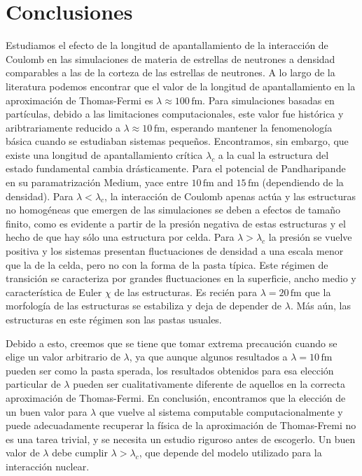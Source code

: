 \section{Conclusiones}\label{concluding}

Estudiamos el efecto de la longitud de apantallamiento de la interacción de Coulomb en las simulaciones de materia de estrellas de neutrones a densidad comparables a las de la corteza de las estrellas de neutrones.
A lo largo de la literatura podemos encontrar que el valor de la longitud de apantallamiento en la aproximación de Thomas-Fermi es $\lambda\approx100\,\text{fm}$.
Para simulaciones basadas en partículas, debido a las limitaciones computacionales, este valor fue histórica y aribtrariamente reducido a $\lambda\approx10\,\text{fm}$, esperando mantener la fenomenología básica cuando se estudiaban sistemas pequeños.
Encontramos, sin embargo, que existe una longitud de apantallamiento crítica $\lambda_c$ a la cual la estructura del estado fundamental cambia drásticamente.
Para el potencial de Pandharipande en su paramatrización Medium, yace entre $10\,\text{fm}$ and $15\,\text{fm}$ (dependiendo de la densidad).
Para $\lambda<\lambda_c$, la interacción de Coulomb apenas actúa y las estructuras no homogéneas que emergen de las simulaciones se deben a efectos de tamaño finito, como es evidente a partir de la presión negativa de estas estructuras y el hecho de que hay sólo una estructura por celda.
Para $\lambda>\lambda_c$ la presión se vuelve positiva y los sistemas presentan fluctuaciones de densidad a una escala menor que la de la celda, pero no con la forma de la pasta típica.
Este régimen de transición se caracteriza por grandes fluctuaciones en la superficie, ancho medio y característica de Euler $\chi$ de las estructuras.
Es recién para $\lambda=20\,\text{fm}$ que la morfología de las estructuras se estabiliza y deja de depender de $\lambda$.
Más aún, las estructuras en este régimen son las pastas usuales.

Debido a esto, creemos que se tiene que tomar extrema precaución cuando se elige un valor arbitrario de $\lambda$, ya que aunque algunos resultados a $\lambda=10\,\text{fm}$ pueden ser como la pasta sperada, los resultados obtenidos para esa elección particular de $\lambda$ pueden ser cualitativamente diferente de aquellos en la correcta aproximación de Thomas-Fermi.
En conclusión, encontramos que la elección de un buen valor para $\lambda$ que vuelve al sistema computable computacionalmente y puede adecuadamente recuperar la física de la aproximación de Thomas-Fremi no es una tarea trivial, y se necesita un estudio riguroso antes de escogerlo.
Un buen valor de $\lambda$ debe cumplir $\lambda>\lambda_c$, que depende del modelo utilizado para la interacción nuclear.

